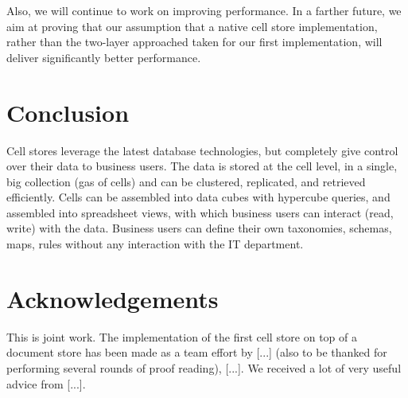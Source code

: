 \documentclass{acm_proc_article-sp}
\begin{document}
Also, we will continue to work on improving performance. In a farther future, we aim at proving that our assumption that a native cell store implementation, rather than the two-layer approached taken for our first implementation, will deliver significantly better performance.

\section{Conclusion}

Cell stores leverage the latest database technologies, but completely give control over their data to business users. The data is stored at the cell level, in a single, big collection (gas of cells) and can be clustered, replicated, and retrieved efficiently. Cells can be assembled into data cubes with hypercube queries, and assembled into spreadsheet views, with which business users can interact (read, write) with the data. Business users can define their own taxonomies, schemas, maps, rules without any interaction with the IT department.

\section{Acknowledgements}

This is joint work. The implementation of the first cell store on top of a document store has been made as a team effort by [...] (also to be thanked for performing several rounds of proof reading), [...]. We received a lot of very useful advice from [...].



\end{document}

